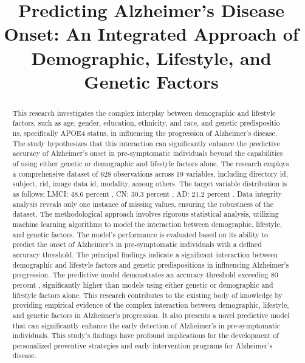 \documentclass[conference]{IEEEtran}
\begin{document}
\title{Predicting Alzheimer's Disease Onset: An Integrated Approach of Demographic, Lifestyle, and Genetic Factors}

\author{
}

\maketitle

\begin{abstract}
This research investigates the complex interplay between demographic and lifestyle factors, such as age, gender, education, ethnicity, and race, and genetic predispositio ns, specifically APOE4 status, in influencing the progression of Alzheimer's disease. The study hypothesizes that this interaction can significantly enhance the predictive accuracy of Alzheimer's onset in pre-symptomatic individuals beyond the capabilities of using either genetic or demographic and lifestyle factors alone. The research employs a comprehensive dataset of 628 observations across 19 variables, including directory id, subject, rid, image data id, modality, among others. The target variable distribution is as follows: LMCI: 48.6 percent , CN: 30.3 percent , AD: 21.2 percent . Data integrity analysis reveals only one instance of missing values, ensuring the robustness of the dataset. The methodological approach involves rigorous statistical analysis, utilizing machine learning algorithms to model the interaction between demographic, lifestyle, and genetic factors. The model's performance is evaluated based on its ability to predict the onset of Alzheimer's in pre-symptomatic individuals with a defined accuracy threshold. The principal findings indicate a significant interaction between demographic and lifestyle factors and genetic predispositions in influencing Alzheimer's progression. The predictive model demonstrates an accuracy threshold exceeding 80 percent , significantly higher than models using either genetic or demographic and lifestyle factors alone. This research contributes to the existing body of knowledge by providing empirical evidence of the complex interaction between demographic, lifestyle, and genetic factors in Alzheimer's progression. It also presents a novel predictive model that can significantly enhance the early detection of Alzheimer's in pre-symptomatic individuals. This study's findings have profound implications for the development of personalized preventive strategies and early intervention programs for Alzheimer's disease.
\end{abstract}
\end{document}

